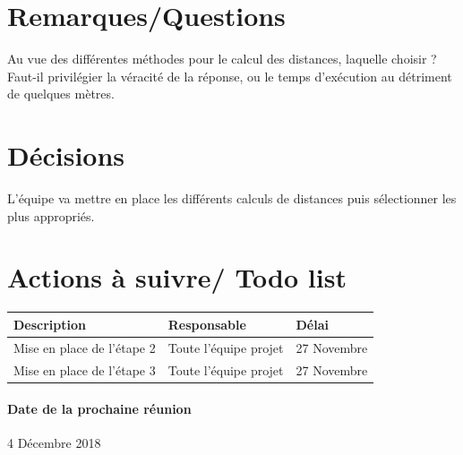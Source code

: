 \documentclass{article}
\begin{document}
\section{Remarques/Questions}
Au vue des différentes méthodes pour le calcul des distances, laquelle choisir ?
Faut-il privilégier la véracité de la réponse, ou le temps d'exécution au détriment de quelques mètres.
\section{Décisions}
L'équipe va mettre en place les différents calculs de distances puis sélectionner les plus appropriés.
\section{Actions à suivre/ Todo list}

\begin{tabular}{|C{5cm}|C{3cm}|C{3cm}|}
\hline {} Description & Responsable & Délai \\
\hline  Mise en place de l'étape 2  & Toute l'équipe projet  & 27 Novembre  \\
\hline 
Mise en place de l'étape 3 & Toute l'équipe projet  & 27 Novembre \\
\hline
\end{tabular}
\paragraph{Date de la prochaine réunion}
4 Décembre 2018
\end{document}

